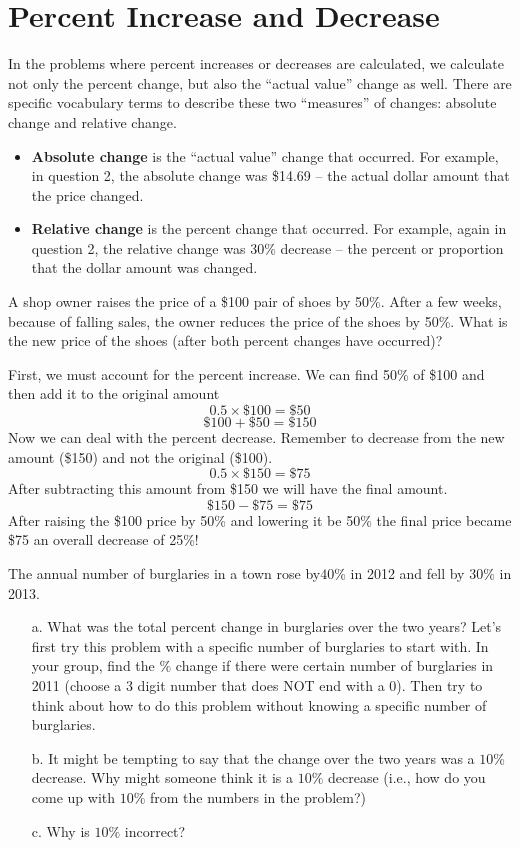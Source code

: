 \documentclass{ximera}
\begin{document}
\section{Percent Increase and Decrease}
In the problems where percent increases or decreases are calculated, we calculate not only the percent change, but also the “actual value” change as well.  There are specific vocabulary terms to describe these two “measures” of changes: absolute change and relative change. 
\begin{itemize}
    \item \textbf{Absolute change} is the “actual value” change that occurred.  For example, in question 2, the absolute change was \$14.69 -- the actual dollar amount that the price changed. 
    \item \textbf{Relative change} is the percent change that occurred.  For example, again in question 2, the relative change was 30\% decrease -- the percent or proportion that the dollar amount was changed. 
\end{itemize}
\begin{example}
A shop owner raises the price of a \$100 pair of shoes by 50\%. After a few weeks, because of falling sales, the owner reduces the price of the shoes by 50\%.
What is the new price of the shoes (after both percent changes have occurred)?
\\
\begin{explanation}
First, we must account for the percent increase. We can find 50\% of \$100 and then add it to the original amount
\[
0.5 \times \$100 = \$50
\]
\[
\$ 100 + \$50 = \$ 150
\]
Now we can deal with the percent decrease. Remember to decrease from the new amount (\$150) and not the original (\$100).
\[
0.5 \times \$150 = \$75
\]
After subtracting this amount from \$150 we will have the final amount.
\[
\$ 150 - \$75 = \$ 75
\]
After raising the \$100 price by 50\% and lowering it be 50\% the final price became \$75 an overall decrease of 25\%!
\end{explanation}
\end{example}
\begin{exploration}
The annual number of burglaries in a town rose by$ 40\%$ in 2012 and fell by $30\%$ in 2013.
\begin{itemize}
\item[a.] What was the total percent change in burglaries over the two years?
Let’s first try this problem with a specific number of burglaries to start with.  In your group, find the $\%$ change if there were certain number of burglaries in 2011 (choose a 3 digit number that does NOT end with a 0).  Then try to think about how to do this problem without knowing a specific number of burglaries.
\item[b.] It might be tempting to say that the change over the two years was a $10\%$ decrease.  Why might someone think it is a $10\%$ decrease (i.e., how do you come up with $10\%$ from the numbers in the problem?)
\item[c.] Why is $10\%$ incorrect?
\end{itemize}
\end{exploration}
\end{document}
